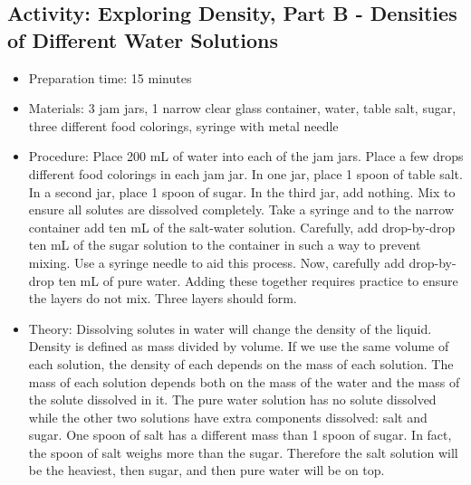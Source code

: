 \begin{itemize}
{\begin{itemize}
\subsection{Activity: Exploring Density, Part B - Densities of Different Water Solutions}
\begin{itemize}
\item{Preparation time: 15 minutes}
\item{Materials: 3 jam jars, 1 narrow clear glass container, water, table salt, sugar, three different food colorings, syringe with metal needle}
\item{Procedure: Place 200 mL of water into each of the jam jars. Place a few drops different food colorings in each jam jar. In one jar, place 1 spoon of table salt. In a second jar, place 1 spoon of sugar. In the third jar, add nothing. Mix to ensure all solutes are dissolved completely. Take a syringe and to the narrow container add ten mL of the salt-water solution. Carefully, add drop-by-drop ten mL of the sugar solution to the container in such a way to prevent mixing. Use a syringe needle to aid this process. Now, carefully add drop-by-drop ten mL of pure water. Adding these together requires practice to ensure the layers do not mix. Three layers should form. }
\item{Theory: Dissolving solutes in water will change the density of the liquid. Density is defined as mass divided by volume. If we use the same volume of each solution, the density of each depends on the mass of each solution. The mass of each solution depends both on the mass of the water and the mass of the solute dissolved in it. The pure water solution has no solute dissolved while the other two solutions have extra components dissolved: salt and sugar. One spoon of salt has a different mass than 1 spoon of sugar. In fact, the spoon of salt weighs more than the sugar. Therefore the salt solution will be the heaviest, then sugar, and then pure water will be on top.}
\end{itemize}


\end{itemize}}
\end{itemize}
